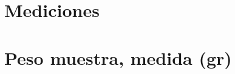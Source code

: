 \documentclass[a4paper,oneside,11pt]{book}
\begin{document}
\section{Mediciones}

\begin{figure} [!h]
  \begin{center}
   \end{center}
   \end{figure}

\section{Peso muestra, medida (gr)}
\end{document}
